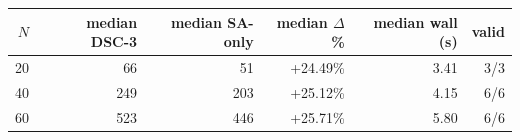\begin{tabular}{rrrrrr}
\toprule
$N$ & median DSC-3 & median SA-only & median $\Delta$\% & median wall (s) & valid \\
\midrule
20 & 66 & 51 & +24.49\% & 3.41 & 3/3 \\
40 & 249 & 203 & +25.12\% & 4.15 & 6/6 \\
60 & 523 & 446 & +25.71\% & 5.80 & 6/6 \\
\bottomrule
\end{tabular}
